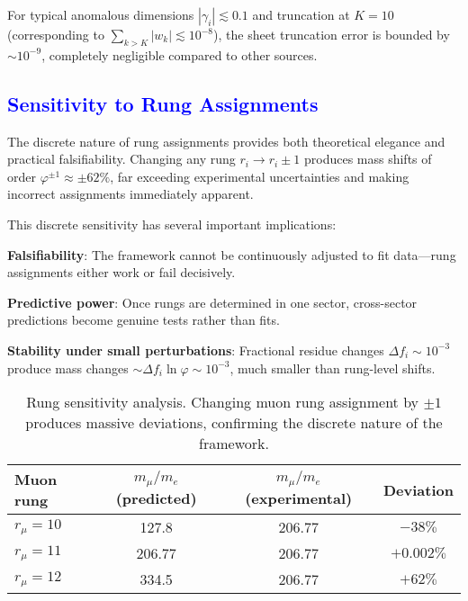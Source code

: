 \documentclass[%
amsmath,amssymb,
aps,
prb,
floatfix, showkeys, 10pt,
]{revtex4-2}
\newcommand{\modif}[1]{\textcolor{blue}{#1}}
\begin{document}
For typical anomalous dimensions $|\gamma_i| \lesssim 0.1$ and truncation at $K = 10$ (corresponding to $\sum_{k > K} |w_k| \lesssim 10^{-8}$), the sheet truncation error is bounded by $\sim 10^{-9}$, completely negligible compared to other sources.
















{\modif{\section{Sensitivity to Rung Assignments}
\label{subsec:rung_sensitivity}  }}

The discrete nature of rung assignments provides both theoretical elegance and practical falsifiability. Changing any rung $r_i \to r_i \pm 1$ produces mass shifts of order $\varphi^{\pm 1} \approx \pm 62\%$, far exceeding experimental uncertainties and making incorrect assignments immediately apparent.

This discrete sensitivity has several important implications:

\textbf{Falsifiability}: The framework cannot be continuously adjusted to fit data—rung assignments either work or fail decisively.

\textbf{Predictive power}: Once rungs are determined in one sector, cross-sector predictions become genuine tests rather than fits.

\textbf{Stability under small perturbations}: Fractional residue changes $\Delta f_i \sim 10^{-3}$ produce mass changes $\sim \Delta f_i \ln\varphi \sim 10^{-3}$, much smaller than rung-level shifts.

\begin{table}[ht]
\centering
\caption{Rung sensitivity analysis. Changing muon rung assignment by $\pm 1$ produces massive deviations, confirming the discrete nature of the framework.}
\label{tab:rung_sensitivity}
\begin{tabular}{lccc}
\hline\hline
Muon rung & $m_\mu/m_e$ (predicted) & $m_\mu/m_e$ (experimental) & Deviation \\
\hline
$r_\mu = 10$ & 127.8 & 206.77 & $-38\%$ \\
$r_\mu = 11$ & 206.77 & 206.77 & $+0.002\%$ \\
$r_\mu = 12$ & 334.5 & 206.77 & $+62\%$ \\
\hline\hline
\end{tabular}
\end{table}
\end{document}
